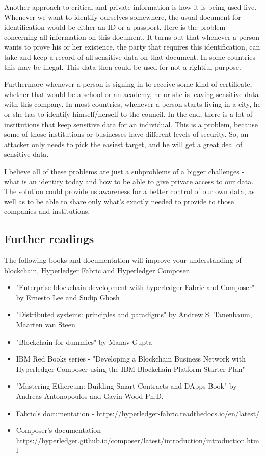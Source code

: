 \documentclass[a4paper,11pt]{report}
\begin{document}
		Another approach to critical and private information is how it is being used live. Whenever we want to identify ourselves somewhere, the usual document for identification would be either an ID or a passport. Here is the problem concerning all information on this document. It turns out that whenever a person wants to prove his or her existence, the party that requires this identification, can take and keep a record of all sensitive data on that document. In some countries this may be illegal. This data then could be used for not a rightful purpose. \cite{alboaie2017private}
		
Furthermore whenever a person is signing in to receive some kind of certificate, whether that would be a school or an academy, he or she is leaving sensitive data with this company. In most countries, whenever a person starts living in a city, he or she has to identify himself/herself to the council. In the end, there is a lot of institutions that keep sensitive data for an individual. This is a problem, because some of those institutions or businesses have different levels of security. So, an attacker only needs to pick the easiest target, and he will get a great deal of sensitive data. 

	I believe all of these problems are just a subproblems of a bigger challenges - what is an identity today and how to be able to give private access to our data. The solution could provide us awareness for a better control of our own data, as well as to be able to share only what’s exactly needed to provide to those companies and institutions.


\subsection{Further readings}
The following books and documentation will improve your understanding of blockchain, Hyperledger Fabric and Hyperledger Composer.

\begin{itemize}
	\item "Enterprise blockchain development with hyperledger Fabric and Composer" by Ernesto Lee and Sudip Ghosh
	\item "Distributed systems: principles and paradigms" by Andrew S. Tanenbaum, Maarten van Steen
	\item "Blockchain for dummies" by Manav Gupta 
	\item IBM Red Books series - "Developing a Blockchain Business Network with Hyperledger Composer using the IBM Blockchain Platform Starter Plan" 
	\item "Mastering Ethereum: Building Smart Contracts and DApps Book" by Andreas Antonopoulos and Gavin Wood Ph.D.
	\item Fabric's documentation - https://hyperledger-fabric.readthedocs.io/en/latest/
	\item Composer's documentation - https://hyperledger.github.io/composer/latest/introduction/introduction.html
\end{itemize}
\end{document}
